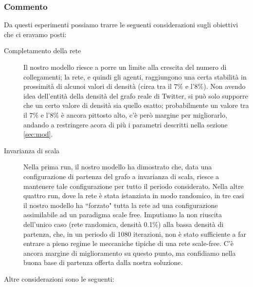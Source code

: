 \documentclass[a4paper,12pt]{article}
\begin{document}
\subsubsection{Commento}
Da questi esperimenti possiamo trarre le seguenti considerazioni sugli obiettivi che ci eravamo posti:
\begin{description}
\item[Completamento della rete] Il nostro modello riesce a porre un limite alla crescita del numero di collegamenti; la rete, e quindi gli agenti, raggiungono una certa stabilità in prossimità di alcunoi valori di densità (circa tra il $7\%$ e l'$8\%$). Non avendo idea dell'entità della densità del grafo reale di Twitter, si può solo supporre che un certo valore di densità sia quello esatto; probabilmente un valore tra il $7\%$ e l'$8\%$ è ancora pittosto alto, c'è però margine per migliorarlo, andando a restringere acora di più i parametri descritti nella sezione \ref{sec:mod}.
\item[Invarianza di scala] Nella prima run, il nostro modello ha dimostrato che, data una configurazione di partenza del grafo a invarianza di scala, riesce a mantenere tale configurazione per tutto il periodo considerato. Nella altre quattro run, dove la rete è stata istanziata in modo randomico, in tre casi il nostro modello ha ``forzato" tutta la rete ad una configurazione assimilabile ad un paradigma scale free. Imputiamo la non riuscita dell'unico caso (rete randomica, densità 0.1\%) alla bassa densità di partenza, che, in un periodo di 1080 iterazioni, non è stato sufficiente a far entrare a pieno regime le meccaniche tipiche di una rete scale-free. C'è ancora margine di miglioramento su questo punto, ma confidiamo nella buona base di partenza offerta dalla nostra soluzione.
\end{description}
Altre considerazioni sono le seguenti:
\end{document}
